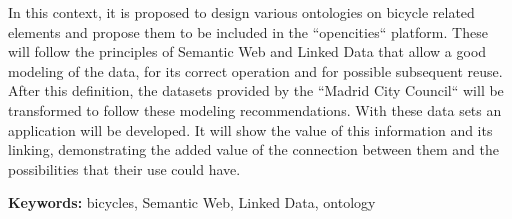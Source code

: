 In this context, it is proposed to design various ontologies on bicycle related elements and propose them to be included in the ``opencities`` platform. These will follow the principles of Semantic Web and Linked Data that allow a good modeling of the data, for its correct operation and for possible subsequent reuse. After this definition, the datasets provided by the ``Madrid City Council`` will be transformed to follow these modeling recommendations. With these data sets an application will be developed. It will show the value of this information and its linking, demonstrating the added value of the connection between them and the possibilities that their use could have.
\newline

\textbf{Keywords:} bicycles, Semantic Web, Linked Data, ontology
